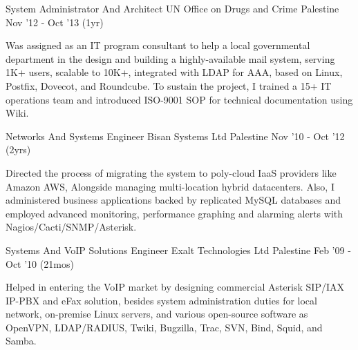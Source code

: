 \begin{cventries}
  \cventry
    {System Administrator And Architect} %
    {UN Office on Drugs and Crime} %
    {Palestine} %
    {Nov ’12 - Oct ’13 (1yr)} %
    {
      \begin{cvitems} %
        {Was assigned as an IT program consultant to help a local governmental department in the design and building a highly-available mail system, serving 1K+ users, scalable to 10K+, integrated with LDAP for AAA, based on Linux, Postfix, Dovecot, and Roundcube. To sustain the project, I trained a 15+ IT operations team and introduced ISO-9001 SOP for technical documentation using Wiki.}
      \end{cvitems}
    }

  \cventry
    {Networks And Systems Engineer} %
    {Bisan Systems Ltd} %
    {Palestine} %
    {Nov ’10 - Oct ’12 (2yrs)} %
    {
      \begin{cvitems} %
        {Directed the process of migrating the system to poly-cloud IaaS providers like Amazon AWS, Alongside managing multi-location hybrid datacenters. Also, I administered business applications backed by replicated MySQL databases and employed advanced monitoring, performance graphing and alarming alerts with Nagios/Cacti/SNMP/Asterisk.}
      \end{cvitems}
    }

  \cventry
    {Systems And VoIP Solutions Engineer} %
    {Exalt Technologies Ltd} %
    {Palestine} %
    {Feb ’09 - Oct ’10 (21mos)} %
    {
      \begin{cvitems} %
        {Helped in entering the VoIP market by designing commercial Asterisk SIP/IAX IP-PBX and eFax solution, besides system administration duties for local network, on-premise Linux servers, and various open-source software as OpenVPN, LDAP/RADIUS, Twiki, Bugzilla, Trac, SVN, Bind, Squid, and Samba.}
      \end{cvitems}
    }

\end{cventries}
